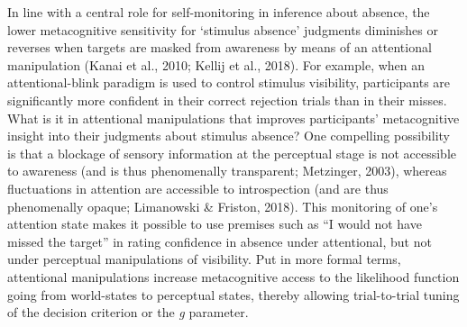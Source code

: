 \documentclass[12pt,twoside]{reedthesis}
\begin{document}
In line with a central role for self-monitoring in inference about absence, the lower metacognitive sensitivity for `stimulus absence' judgments diminishes or reverses when targets are masked from awareness by means of an attentional manipulation (Kanai et al., 2010; Kellij et al., 2018). For example, when an attentional-blink paradigm is used to control stimulus visibility, participants are significantly more confident in their correct rejection trials than in their misses. What is it in attentional manipulations that improves participants' metacognitive insight into their judgments about stimulus absence? One compelling possibility is that a blockage of sensory information at the perceptual stage is not accessible to awareness (and is thus phenomenally transparent; Metzinger, 2003), whereas fluctuations in attention are accessible to introspection (and are thus phenomenally opaque; Limanowski \& Friston, 2018). This monitoring of one's attention state makes it possible to use premises such as ``I would not have missed the target'' in rating confidence in absence under attentional, but not under perceptual manipulations of visibility. Put in more formal terms, attentional manipulations increase metacognitive access to the likelihood function going from world-states to perceptual states, thereby allowing trial-to-trial tuning of the decision criterion or the \emph{g} parameter.
\end{document}
